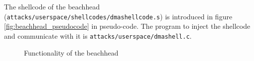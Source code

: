 The shellcode of the beachhead
(\texttt{attacks/userspace/shellcodes/dmashellcode.s}) is introduced in figure
\ref{fig:beachhead_pseudocode} in pseudo-code. The program to inject the
shellcode and communicate with it is \texttt{attacks/userspace/dmashell.c}.

\begin{figure}[htb] \begin{center}

	\epsfysize 5cm


	\caption{Functionality of the beachhead}

	\label{fig:functionality_beachhead}

\end{center}\end{figure}


